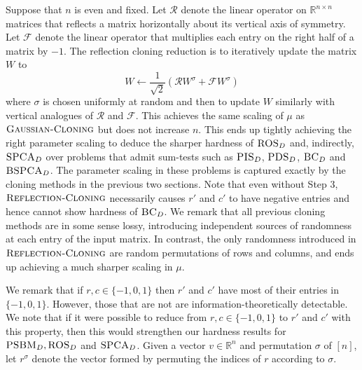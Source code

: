 \documentclass[11pt]{article}
\begin{document}
Suppose that $n$ is even and fixed. Let $\mathcal{R}$ denote the linear operator on $\mathbb{R}^{n \times n}$ matrices that reflects a matrix horizontally about its vertical axis of symmetry. Let $\mathcal{F}$ denote the linear operator that multiplies each entry on the right half of a matrix by $-1$. The reflection cloning reduction is to iteratively update the matrix $W$ to
$$W \gets \frac{1}{\sqrt{2}} \left( \mathcal{R} W^\sigma + \mathcal{F} W^\sigma \right)$$
where $\sigma$ is chosen uniformly at random and then to update $W$ similarly with vertical analogues of $\mathcal{R}$ and $\mathcal{F}$. This achieves the same scaling of $\mu$ as $\textsc{Gaussian-Cloning}$ but does not increase $n$. This ends up tightly achieving the right parameter scaling to deduce the sharper hardness of $\textsc{ROS}_D$ and, indirectly, $\textsc{SPCA}_D$ over problems that admit sum-tests such as $\textsc{PIS}_D$, $\textsc{PDS}_D$, $\textsc{BC}_D$ and $\textsc{BSPCA}_D$. The parameter scaling in these problems is captured exactly by the cloning methods in the previous two sections. Note that even without Step 3, $\textsc{Reflection-Cloning}$ necessarily causes $r'$ and $c'$ to have negative entries and hence cannot show hardness of $\textsc{BC}_D$. We remark that all previous cloning methods are in some sense lossy, introducing independent sources of randomness at each entry of the input matrix. In contrast, the only randomness introduced in $\textsc{Reflection-Cloning}$ are random permutations of rows and columns, and ends up achieving a much sharper scaling in $\mu$.

We remark that if $r, c \in \{-1, 0, 1\}$ then $r'$ and $c'$ have most of their entries in $\{-1, 0, 1\}$. However, those that are not are information-theoretically detectable. We note that if it were possible to reduce from $r, c \in \{-1, 0, 1\}$ to $r'$ and $c'$ with this property, then this would strengthen our hardness results for $\textsc{PSBM}_D, \textsc{ROS}_D$ and $\textsc{SPCA}_D$. Given a vector $v \in \mathbb{R}^n$ and permutation $\sigma$ of $[n]$, let $r^\sigma$ denote the vector formed by permuting the indices of $r$ according to $\sigma$.
\end{document}
